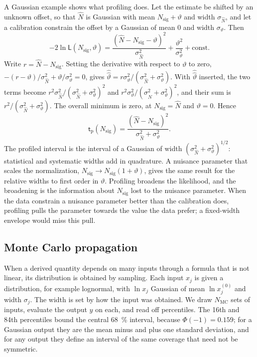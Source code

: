 A Gaussian example shows what profiling does. Let the estimate be shifted by an unknown offset, so that $\hat N$ is Gaussian with mean $N_{\mathrm{sig}} + \vartheta$ and width $\sigma_{\hat N}$, and let a calibration constrain the offset by a Gaussian of mean 0 and width $\sigma_\vartheta$. Then
\begin{equation*}
  -2\ln\mathsf{L}(N_{\mathrm{sig}}, \vartheta) = \frac{(\hat N - N_{\mathrm{sig}} - \vartheta)^2}{\sigma_{\hat N}^2} + \frac{\vartheta^2}{\sigma_\vartheta^2} + \mathrm{const} .
\end{equation*}
Write $r = \hat N - N_{\mathrm{sig}}$. Setting the derivative with respect to $\vartheta$ to zero, $-(r - \vartheta)/\sigma_{\hat N}^2 + \vartheta/\sigma_\vartheta^2 = 0$, gives $\hat{\hat\vartheta} = r\sigma_\vartheta^2/(\sigma_{\hat N}^2 + \sigma_\vartheta^2)$. With $\hat{\hat\vartheta}$ inserted, the two terms become $r^2\sigma_{\hat N}^2/(\sigma_{\hat N}^2 + \sigma_\vartheta^2)^2$ and $r^2\sigma_\vartheta^2/(\sigma_{\hat N}^2 + \sigma_\vartheta^2)^2$, and their sum is $r^2/(\sigma_{\hat N}^2 + \sigma_\vartheta^2)$. The overall minimum is zero, at $N_{\mathrm{sig}} = \hat N$ and $\vartheta = 0$. Hence
\begin{equation}
  \mathsf{t}_{\mathrm{p}}(N_{\mathrm{sig}}) = \frac{(\hat N - N_{\mathrm{sig}})^2}{\sigma_{\hat N}^2 + \sigma_\vartheta^2} .
  \label{eq:C.14-quadrature}
\end{equation}
The profiled interval is the interval of a Gaussian of width $(\sigma_{\hat N}^2 + \sigma_\vartheta^2)^{1/2}$: statistical and systematic widths add in quadrature. A nuisance parameter that scales the normalization, $N_{\mathrm{sig}} \to N_{\mathrm{sig}}(1 + \vartheta)$, gives the same result for the relative widths to first order in $\vartheta$. Profiling broadens the likelihood, and the broadening is the information about $N_{\mathrm{sig}}$ lost to the nuisance parameter. When the data constrain a nuisance parameter better than the calibration does, profiling pulls the parameter towards the value the data prefer; a fixed-width envelope would miss this pull.

\subsection{Monte Carlo propagation}

When a derived quantity depends on many inputs through a formula that is not linear, its distribution is obtained by sampling. Each input $x_j$ is given a distribution, for example lognormal, with $\ln x_j$ Gaussian of mean $\ln x_j^{(0)}$ and width $\sigma_j$. The width is set by how the input was obtained. We draw $N_{\mathrm{MC}}$ sets of inputs, evaluate the output $y$ on each, and read off percentiles. The 16th and 84th percentiles bound the central \SI{68}{\percent} interval, because $\Phi(-1) = 0.159$; for a Gaussian output they are the mean minus and plus one standard deviation, and for any output they define an interval of the same coverage that need not be symmetric.

